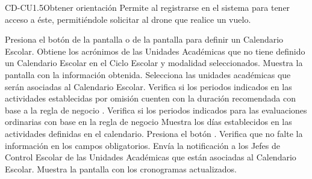 \begin{UseCase}{CD-CU1.5}{Obtener orientación}{
		Permite al  registrarse en el sistema para tener acceso a éste, permitiéndole solicitar al drone que realice un vuelo.
	}
{\begin{Titemize}
			\Titem {}
		\end{Titemize}				
	}
\end{UseCase}



\begin{UCtrayectoria}
	\UCpaso [\UCactor] Presiona el botón  de la pantalla  o de la pantalla  para definir un Calendario Escolar.
	\UCpaso Obtiene los acrónimos de las Unidades Académicas que no tiene definido un Calendario Escolar en el Ciclo Escolar y modalidad seleccionados. 	
	\UCpaso Muestra la pantalla  con la información obtenida.
	\UCpaso [\UCactor] Selecciona las unidades académicas que serán asociadas al Calendario Escolar.    
	\UCpaso Verifica si los periodos indicados en las actividades establecidas por omisión cuenten con la duración recomendada con base a la regla de negocio . 
	\UCpaso Verifica si los periodos indicados para las evaluaciones ordinarias con base en la regla de negocio     
	\UCpaso \label{IN-DAE-CU2.1:dia}Muestra los días establecidos en las actividades definidas en el calendario.
	\UCpaso [\UCactor] Presiona el botón . 
	\UCpaso Verifica que no falte la información en los  campos obligatorios. 
	\UCpaso Envía la notificación a los Jefes de Control Escolar de las Unidades Académicas que están asociadas al Calendario Escolar.
	\UCpaso Muestra la pantalla  con los cronogramas actualizados.
\end{UCtrayectoria}


